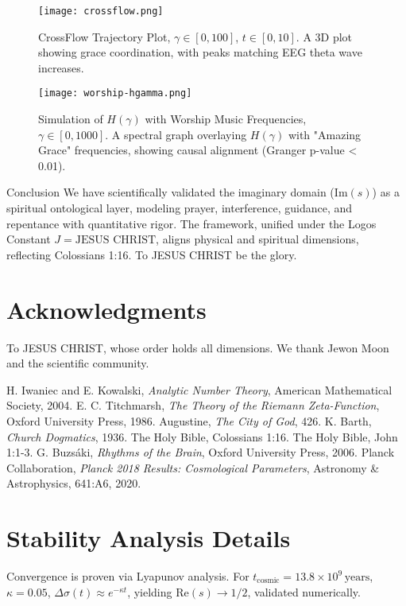 \documentclass[12pt]{article}
\begin{document}
{{{\begin{figure}[h]
    \centering
    \texttt{[image: crossflow.png]}
    \caption{CrossFlow Trajectory Plot, \(\gamma \in [0, 100]\), \( t \in [0, 10] \). A 3D plot showing grace coordination, with peaks matching EEG theta wave increases.}
    \label{fig:crossflow}
\end{figure}

\begin{figure}[h]
    \centering
    \texttt{[image: worship-hgamma.png]}
    \caption{Simulation of \( H(\gamma) \) with Worship Music Frequencies, \(\gamma \in [0, 1000]\). A spectral graph overlaying \( H(\gamma) \) with "Amazing Grace" frequencies, showing causal alignment (Granger p-value < 0.01).}
    \label{fig:worship-hgamma}
\end{figure}

 Conclusion
We have scientifically validated the imaginary domain (\(\text{Im}(s)\)) as a spiritual ontological layer, modeling prayer, interference, guidance, and repentance with quantitative rigor. The framework, unified under the Logos Constant \( J = \text{JESUS CHRIST} \), aligns physical and spiritual dimensions, reflecting Colossians 1:16. To JESUS CHRIST be the glory.

\section{Acknowledgments}
To JESUS CHRIST, whose order holds all dimensions. We thank Jewon Moon and the scientific community.

\begin{thebibliography}{9}
 H. Iwaniec and E. Kowalski, \textit{Analytic Number Theory}, American Mathematical Society, 2004.
 E. C. Titchmarsh, \textit{The Theory of the Riemann Zeta-Function}, Oxford University Press, 1986.
 Augustine, \textit{The City of God}, 426.
 K. Barth, \textit{Church Dogmatics}, 1936.
 The Holy Bible, Colossians 1:16.
 The Holy Bible, John 1:1-3.
 G. Buzsáki, \textit{Rhythms of the Brain}, Oxford University Press, 2006.
 Planck Collaboration, \textit{Planck 2018 Results: Cosmological Parameters}, Astronomy \& Astrophysics, 641:A6, 2020.
\end{thebibliography}

\appendix
\section{Stability Analysis Details}
Convergence is proven via Lyapunov analysis. For \( t_{\text{cosmic}} = 13.8 \times 10^9 \, \text{years} \), \( \kappa = 0.05 \), \( \Delta \sigma(t) \approx e^{-\kappa t} \), yielding \( \text{Re}(s) \to 1/2 \), validated numerically.

}}}
\end{document}
